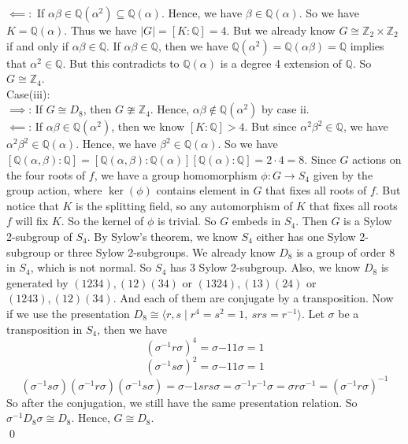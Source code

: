 \documentclass[12pt]{amsart}
\newcommand{\Q}{\mathbb{Q}}
\newcommand{\Z}{\mathbb{Z}}
\begin{document}
$\impliedby:$ If $\alpha\beta\in\Q(\alpha^2)\subseteq \Q(\alpha)$. Hence, we have $\beta\in\Q(\alpha)$. So we have $K=\Q(\alpha)$. Thus we have $|G|=[K:\Q]=4$. But we already know $G\cong \Z_2\times \Z_2$ if and only if $\alpha\beta\in \Q$. If $\alpha\beta\in\Q$, then we have $\Q(\alpha^2)=\Q(\alpha\beta)=\Q$ implies that $\alpha^2\in\Q$. But this contradicts to $\Q(\alpha)$ is a degree 4 extension of $\Q$. So $G\cong \Z_4$.\\
Case(iii):\\
$\implies$: If $G\cong D_8$, then $G\ncong \Z_4$. Hence, $\alpha\beta\notin\Q(\alpha^2)$ by case ii.\\
$\impliedby$: If $\alpha\beta\in \Q(\alpha^2)$, then we know $[K:\Q]>4$. But since $\alpha^2\beta^2\in\Q$, we have $\alpha^2\beta^2\in\Q(\alpha)$. Hence, we have $\beta^2\in\Q(\alpha)$. So we have $[\Q(\alpha,\beta):\Q]=[\Q(\alpha,\beta):\Q(\alpha)][\Q(\alpha):\Q]=2\cdot 4=8$. Since $G$ actions on the four roots of $f$, we have a group homomorphism $\phi:G\to S_4$ given by the group action, where $\ker(\phi)$ contains element in $G$ that fixes all roots of $f$. But notice that $K$ is the splitting field, so any automorphism of $K$ that fixes all roots $f$ will fix $K$. So the kernel of $\phi$ is trivial. So $G$ embeds in $S_4$. Then $G$ is a Sylow 2-subgroup of $S_4$. By Sylow's theorem, we know $S_4$ either has one Sylow 2-subgroup or three Sylow 2-subgroups. We already know $D_8$ is a group of order 8 in $S_4$, which is not normal. So $S_4$ has 3 Sylow 2-subgroup. Also, we know $D_8$ is generated by $(1234),(12)(34)$ or $(1324),(13)(24)$ or $(1243),(12)(34)$. And each of them are conjugate by a transposition. Now if we use the presentation $D_8\cong \langle r,s\mid r^4=s^2=1,\ srs=r^{-1}\rangle$. Let $\sigma$ be a transposition in $S_4$, then we have 
\[(\sigma^{-1}r\sigma)^4=\sigma{-1}1\sigma=1\]
\[(\sigma^{-1}s\sigma)^2=\sigma{-1}1\sigma=1\]
\[(\sigma^{-1}s\sigma)(\sigma^{-1}r\sigma)(\sigma^{-1}s\sigma)=\sigma{-1}srs\sigma=\sigma^{-1}r^{-1}\sigma=\sigma r\sigma^{-1}=(\sigma^{-1}r\sigma)^{-1}\]
So after the conjugation, we still have the same presentation relation. So $\sigma^{-1}D_8\sigma\cong D_8$. Hence, $G\cong D_8$.
 \\\qed\\
\end{document}
